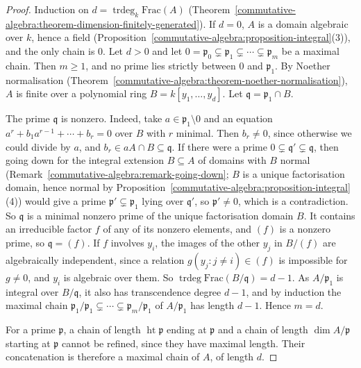 \begin{proof}
Induction on $d = \operatorname{trdeg}_k\mathrm{Frac}(A)$ (Theorem~\ref{commutative-algebra:theorem-dimension-finitely-generated}). If $d = 0$,
$A$ is a domain algebraic over $k$, hence a field (Proposition~\ref{commutative-algebra:proposition-integral}(3)), and the only chain is $0$. Let
$d > 0$ and let $0 = \mathfrak{p}_0 \subsetneq \mathfrak{p}_1 \subsetneq \cdots \subsetneq \mathfrak{p}_m$ be a maximal chain. Then $m \geq 1$, and no prime
lies strictly between $0$ and $\mathfrak{p}_1$. By Noether normalisation (Theorem~\ref{commutative-algebra:theorem-noether-normalisation}), $A$ is
finite over a polynomial ring $B = k[y_1, \ldots, y_d]$. Let $\mathfrak{q} = \mathfrak{p}_1 \cap B$.

The prime $\mathfrak{q}$ is nonzero. Indeed, take $a \in \mathfrak{p}_1 \setminus 0$ and an equation $a^r + b_1a^{r-1} + \cdots + b_r = 0$ over $B$ with $r$
minimal. Then $b_r \neq 0$, since otherwise we could divide by $a$, and $b_r \in aA \cap B \subseteq \mathfrak{q}$. If there were a prime
$0 \subsetneq \mathfrak{q}' \subsetneq \mathfrak{q}$, then going down for the integral extension $B \subseteq A$ of domains with $B$ normal
(Remark~\ref{commutative-algebra:remark-going-down}; $B$ is a unique factorisation domain, hence normal by
Proposition~\ref{commutative-algebra:proposition-integral}(4)) would give a prime $\mathfrak{p}' \subsetneq \mathfrak{p}_1$ lying over $\mathfrak{q}'$, so
$\mathfrak{p}' \neq 0$, which is a contradiction. So $\mathfrak{q}$ is a minimal nonzero prime of the unique factorisation domain $B$. It contains an
irreducible factor $f$ of any of its nonzero elements, and $(f)$ is a nonzero prime, so $\mathfrak{q} = (f)$. If $f$ involves $y_i$, the images of the
other $y_j$ in $B/(f)$ are algebraically independent, since a relation $g(y_j : j \neq i) \in (f)$ is impossible for $g \neq 0$, and $y_i$ is
algebraic over them. So $\operatorname{trdeg}\mathrm{Frac}(B/\mathfrak{q}) = d - 1$. As $A/\mathfrak{p}_1$ is integral over $B/\mathfrak{q}$, it also has
transcendence degree $d - 1$, and by induction the maximal chain $\mathfrak{p}_1/\mathfrak{p}_1 \subsetneq \cdots \subsetneq \mathfrak{p}_m/\mathfrak{p}_1$ of
$A/\mathfrak{p}_1$ has length $d - 1$. Hence $m = d$.

For a prime $\mathfrak{p}$, a chain of length $\operatorname{ht}\mathfrak{p}$ ending at $\mathfrak{p}$ and a chain of length $\dim A/\mathfrak{p}$ starting at
$\mathfrak{p}$ cannot be refined, since they have maximal length. Their concatenation is therefore a maximal chain of $A$, of length $d$.
\end{proof}

